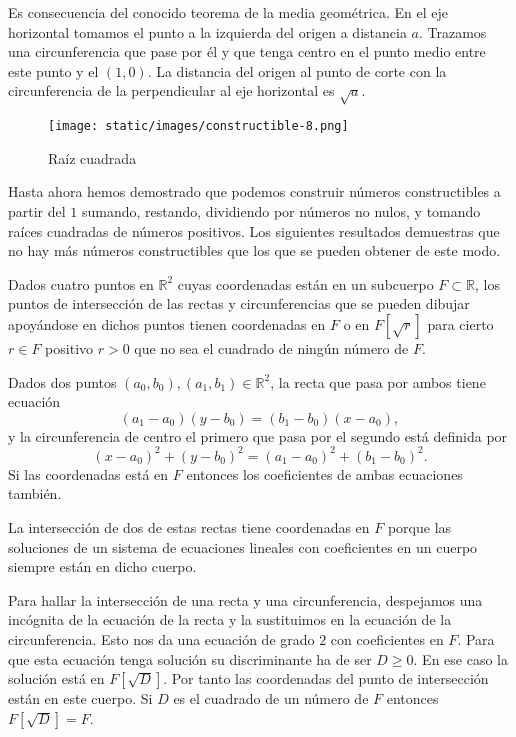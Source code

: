 Es consecuencia del conocido teorema de la media geométrica. En el eje
horizontal tomamos el punto a la izquierda del origen a distancia \(a\).
Trazamos una circunferencia que pase por él y que tenga centro en el
punto medio entre este punto y el \((1,0)\). La distancia del origen al
punto de corte con la circunferencia de la perpendicular al eje
horizontal es \(\sqrt{a}\).

\begin{figure}
\centering
\texttt{[image: static/images/constructible-8.png]}
\caption{Raíz cuadrada}
\end{figure}


Hasta ahora hemos demostrado que podemos construir números
constructibles a partir del \(1\) sumando, restando, dividiendo por
números no nulos, y tomando raíces cuadradas de números positivos. Los
siguientes resultados demuestras que no hay más números constructibles
que los que se pueden obtener de este modo.


Dados cuatro puntos en \(\mathbb R^2\) cuyas coordenadas están en un
subcuerpo \(F\subset\mathbb R\), los puntos de intersección de las
rectas y circunferencias que se pueden dibujar apoyándose en dichos
puntos tienen coordenadas en \(F\) o en \(F[\sqrt{r}]\) para cierto
\(r\in F\) positivo \(r>0\) que no sea el cuadrado de ningún número de
\(F\). 


Dados dos puntos \((a_0,b_0), (a_1,b_1)\in\mathbb R^2\), la recta
que pasa por ambos tiene ecuación
\[(a_1-a_0)(y-b_0)=(b_1-b_0)(x-a_0),\] y la circunferencia de
centro el primero que pasa por el segundo está definida por
\[(x-a_0)^2+(y-b_0)^2=(a_1-a_0)^2+(b_1-b_0)^2.\] Si las
coordenadas está en \(F\) entonces los coeficientes de ambas ecuaciones
también.

La intersección de dos de estas rectas tiene coordenadas en \(F\) porque
las soluciones de un sistema de ecuaciones lineales con coeficientes en
un cuerpo siempre están en dicho cuerpo.

Para hallar la intersección de una recta y una circunferencia,
despejamos una incógnita de la ecuación de la recta y la sustituimos en
la ecuación de la circunferencia. Esto nos da una ecuación de grado
\(2\) con coeficientes en \(F\). Para que esta ecuación tenga solución
su discriminante ha de ser \(D\geq 0\). En ese caso la solución está en
\(F[\sqrt{D}]\). Por tanto las coordenadas del punto de intersección
están en este cuerpo. Si \(D\) es el cuadrado de un número de \(F\)
entonces \(F[\sqrt{D}]=F\).

